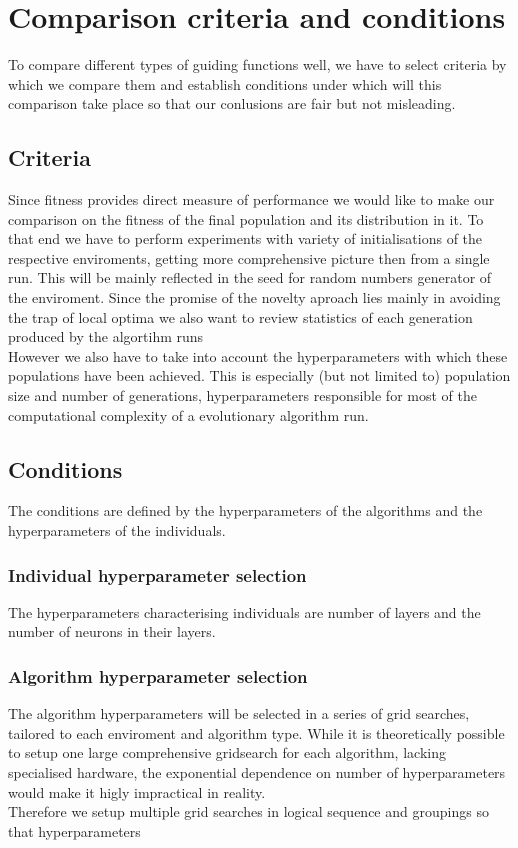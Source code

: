 \chapter{Comparison criteria and conditions}
To compare different types of guiding functions well, we have to select criteria by which we compare them and establish conditions under which will this comparison take place so that our conlusions are fair but not misleading.
\section{Criteria}
Since fitness provides direct measure of performance we would like to make our comparison on the fitness of the final population and its distribution in it. To that end we have to perform experiments with variety of initialisations of the respective enviroments, getting more comprehensive picture then from a single run. This will be mainly reflected in the seed for random numbers generator of the enviroment. Since the promise of the novelty aproach lies mainly in avoiding the trap of local optima we also want to review statistics of each generation produced by the algortihm runs\\
However we also have to take into account the hyperparameters with which these populations have been achieved. This is especially (but not limited to) population size and number of generations, hyperparameters responsible for most of the computational complexity of a evolutionary algorithm run. 
\section{Conditions}
The conditions are defined by the hyperparameters of the algorithms and the hyperparameters of the individuals.
\subsection{Individual hyperparameter selection}
The hyperparameters characterising individuals are number of layers and the number of neurons in their layers.  
\subsection{Algorithm hyperparameter selection}
The algorithm hyperparameters will be selected in a series of grid searches, tailored to each enviroment and algorithm type. While it is theoretically possible to setup one large comprehensive gridsearch for each algorithm, lacking specialised hardware, the exponential dependence on number of hyperparameters would make it higly impractical in reality.\\
Therefore we setup multiple grid searches in logical sequence and groupings so that hyperparameters 